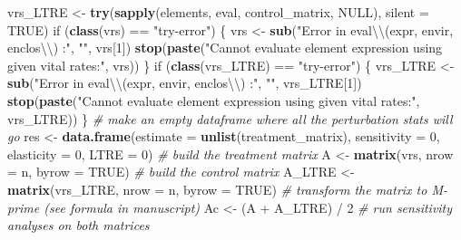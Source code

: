 \documentclass[]{article}
\newenvironment{Shaded}{\begin{snugshade}}{\end{snugshade}}
\newcommand{\KeywordTok}[1]{\textcolor[rgb]{0.13,0.29,0.53}{\textbf{{#1}}}}
\newcommand{\DataTypeTok}[1]{\textcolor[rgb]{0.13,0.29,0.53}{{#1}}}
\newcommand{\DecValTok}[1]{\textcolor[rgb]{0.00,0.00,0.81}{{#1}}}
\newcommand{\CharTok}[1]{\textcolor[rgb]{0.31,0.60,0.02}{{#1}}}
\newcommand{\StringTok}[1]{\textcolor[rgb]{0.31,0.60,0.02}{{#1}}}
\newcommand{\CommentTok}[1]{\textcolor[rgb]{0.56,0.35,0.01}{\textit{{#1}}}}
\newcommand{\OtherTok}[1]{\textcolor[rgb]{0.56,0.35,0.01}{{#1}}}
\newcommand{\NormalTok}[1]{{#1}}
\begin{document}
\begin{Shaded}
\begin{Highlighting}[]
{{{      \NormalTok{vrs_LTRE <-}\StringTok{ }\KeywordTok{try}\NormalTok{(}\KeywordTok{sapply}\NormalTok{(elements, eval, control_matrix, }\OtherTok{NULL}\NormalTok{), }\DataTypeTok{silent =} \OtherTok{TRUE}\NormalTok{)}
      \NormalTok{if (}\KeywordTok{class}\NormalTok{(vrs) ==}\StringTok{ "try-error"}\NormalTok{) \{}
        \NormalTok{vrs <-}\StringTok{ }\KeywordTok{sub}\NormalTok{(}\StringTok{"Error in eval}\CharTok{\textbackslash{}\textbackslash{}}\StringTok{(expr, envir, enclos}\CharTok{\textbackslash{}\textbackslash{}}\StringTok{) :"}\NormalTok{,}
                   \StringTok{""}\NormalTok{, vrs[}\DecValTok{1}\NormalTok{])}
        \KeywordTok{stop}\NormalTok{(}\KeywordTok{paste}\NormalTok{(}\StringTok{"Cannot evaluate element expression using given vital rates:"}\NormalTok{,}
                   \NormalTok{vrs))}
      \NormalTok{\}}
      \NormalTok{if (}\KeywordTok{class}\NormalTok{(vrs_LTRE) ==}\StringTok{ "try-error"}\NormalTok{) \{}
        \NormalTok{vrs_LTRE <-}\StringTok{ }\KeywordTok{sub}\NormalTok{(}\StringTok{"Error in eval}\CharTok{\textbackslash{}\textbackslash{}}\StringTok{(expr, envir, enclos}\CharTok{\textbackslash{}\textbackslash{}}\StringTok{) :"}\NormalTok{,}
                        \StringTok{""}\NormalTok{, vrs_LTRE[}\DecValTok{1}\NormalTok{])}
        \KeywordTok{stop}\NormalTok{(}\KeywordTok{paste}\NormalTok{(}\StringTok{"Cannot evaluate element expression using given vital rates:"}\NormalTok{,}
                   \NormalTok{vrs_LTRE))}
      \NormalTok{\}}
      \CommentTok{# make an empty dataframe where all the perturbation stats will go}
      \NormalTok{res <-}\StringTok{ }\KeywordTok{data.frame}\NormalTok{(}\DataTypeTok{estimate =} \KeywordTok{unlist}\NormalTok{(treatment_matrix), }\DataTypeTok{sensitivity =} \DecValTok{0}\NormalTok{, }
                        \DataTypeTok{elasticity =} \DecValTok{0}\NormalTok{, }\DataTypeTok{LTRE =} \DecValTok{0}\NormalTok{)}
      \CommentTok{# build the treatment matrix}
      \NormalTok{A <-}\StringTok{ }\KeywordTok{matrix}\NormalTok{(vrs, }\DataTypeTok{nrow =} \NormalTok{n, }\DataTypeTok{byrow =} \OtherTok{TRUE}\NormalTok{)}
      \CommentTok{# build the control matrix}
      \NormalTok{A_LTRE <-}\StringTok{ }\KeywordTok{matrix}\NormalTok{(vrs_LTRE, }\DataTypeTok{nrow =} \NormalTok{n, }\DataTypeTok{byrow =} \OtherTok{TRUE}\NormalTok{)}
      \CommentTok{# transform the matrix to M-prime (see formula in manuscript)}
      \NormalTok{Ac <-}\StringTok{ }\NormalTok{(A +}\StringTok{ }\NormalTok{A_LTRE) /}\StringTok{ }\DecValTok{2}
      \CommentTok{# run sensitivity analyses on both matrices}
}}}
\end{Highlighting}
\end{Shaded}
\end{document}
